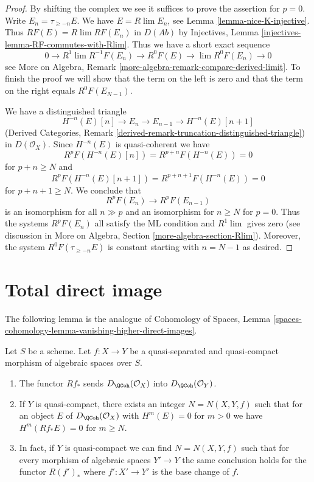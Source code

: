 \begin{proof}
By shifting the complex we see it suffices to prove the assertion for $p = 0$.
Write $E_n = \tau_{\geq -n}E$. We have $E = R\lim E_n$, see
Lemma \ref{lemma-nice-K-injective}. Thus
$RF(E) = R\lim RF(E_n)$ in $D(\textit{Ab})$ by Injectives, Lemma
\ref{injectives-lemma-RF-commutes-with-Rlim}. Thus we have a short
exact sequence
$$
0 \to R^1\lim R^{-1}F(E_n) \to R^0F(E) \to \lim R^0F(E_n) \to 0
$$
see More on Algebra, Remark
\ref{more-algebra-remark-compare-derived-limit}.
To finish the proof we will show that the term on the left is zero
and that the term on the right equals $R^0F(E_{N - 1})$.

\medskip\noindent
We have a distinguished triangle
$$
H^{-n}(E)[n] \to E_n \to E_{n - 1} \to H^{-n}(E)[n + 1]
$$
(Derived Categories, Remark
\ref{derived-remark-truncation-distinguished-triangle})
in $D(\mathcal{O}_X)$. Since $H^{-n}(E)$ is quasi-coherent we have
$$
R^pF(H^{-n}(E)[n]) = R^{p + n}F(H^{-n}(E)) = 0
$$
for $p + n \geq N$ and
$$
R^pF(H^{-n}(E)[n + 1]) = R^{p + n + 1}F(H^{-n}(E)) = 0
$$
for $p + n + 1 \geq N$. We conclude that
$$
R^pF(E_n) \to R^pF(E_{n - 1})
$$
is an isomorphism for all $n \gg p$ and an isomorphism for
$n \geq N$ for $p = 0$. Thus the systems $R^pF(E_n)$ all
satisfy the ML condition and $R^1\lim$ gives zero (see discussion
in More on Algebra, Section \ref{more-algebra-section-Rlim}).
Moreover, the system $R^0F(\tau_{\geq - n}E)$ is constant starting
with $n = N - 1$ as desired.
\end{proof}









\section{Total direct image}
\label{section-total-direct-image}

\noindent
The following lemma is the analogue of
Cohomology of Spaces, Lemma
\ref{spaces-cohomology-lemma-vanishing-higher-direct-images}.

\begin{lemma}
\label{lemma-quasi-coherence-direct-image}
Let $S$ be a scheme. Let $f : X \to Y$ be a quasi-separated and quasi-compact
morphism of algebraic spaces over $S$.
\begin{enumerate}
\item The functor $Rf_*$ sends $D_\QCoh(\mathcal{O}_X)$
into $D_\QCoh(\mathcal{O}_Y)$.
\item If $Y$ is quasi-compact, there exists an integer $N = N(X, Y, f)$
such that for an object $E$ of $D_\QCoh(\mathcal{O}_X)$
with $H^m(E) = 0$ for $m > 0$ we have
$H^m(Rf_*E) = 0$ for $m \geq N$.
\item In fact, if $Y$ is quasi-compact we can find $N = N(X, Y, f)$
such that for every morphism of algebraic spaces $Y' \to Y$
the same conclusion holds for the functor $R(f')_*$
where $f' : X' \to Y'$ is the base change of $f$.
\end{enumerate}
\end{lemma}

